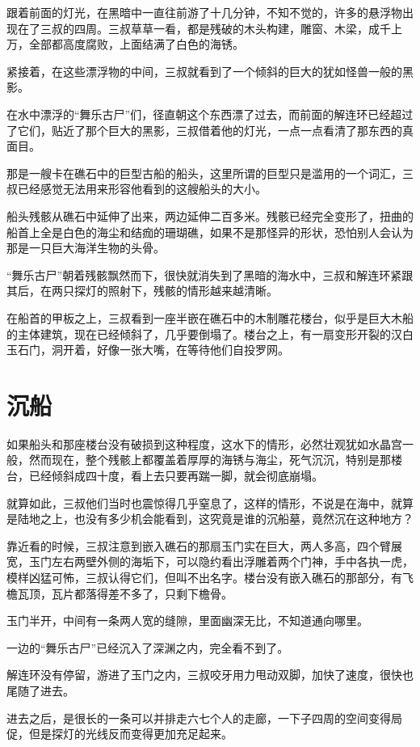 跟着前面的灯光，在黑暗中一直往前游了十几分钟，不知不觉的，许多的悬浮物出现在了三叔的四周。三叔草草一看，都是残破的木头构建，雕窗、木梁，成千上万，全部都高度腐败，上面结满了白色的海锈。

紧接着，在这些漂浮物的中间，三叔就看到了一个倾斜的巨大的犹如怪兽一般的黑影。

在水中漂浮的“舞乐古尸”们，径直朝这个东西漂了过去，而前面的解连环已经超过了它们，贴近了那个巨大的黑影，三叔借着他的灯光，一点一点看清了那东西的真面目。

那是一艘卡在礁石中的巨型古船的船头，这里所谓的巨型只是滥用的一个词汇，三叔已经感觉无法用来形容他看到的这艘船头的大小。

船头残骸从礁石中延伸了出来，两边延伸二百多米。残骸已经完全变形了，扭曲的船首上全是白色的海尘和结痂的珊瑚礁，如果不是那怪异的形状，恐怕别人会认为那是一只巨大海洋生物的头骨。

“舞乐古尸”朝着残骸飘然而下，很快就消失到了黑暗的海水中，三叔和解连环紧跟其后，在两只探灯的照射下，残骸的情形越来越清晰。

在船首的甲板之上，三叔看到一座半嵌在礁石中的木制雕花楼台，似乎是巨大木船的主体建筑，现在已经倾斜了，几乎要倒塌了。楼台之上，有一扇变形开裂的汉白玉石门，洞开着，好像一张大嘴，在等待他们自投罗网。

\chapter{沉船}

如果船头和那座楼台没有破损到这种程度，这水下的情形，必然壮观犹如水晶宫一般，然而现在，整个残骸上都覆盖着厚厚的海锈与海尘，死气沉沉，特别是那楼台，已经倾斜成四十度，看上去只要再踹一脚，就会彻底崩塌。

就算如此，三叔他们当时也震惊得几乎窒息了，这样的情形，不说是在海中，就算是陆地之上，也没有多少机会能看到，这究竟是谁的沉船墓，竟然沉在这种地方？

靠近看的时候，三叔注意到嵌入礁石的那扇玉门实在巨大，两人多高，四个臂展宽，玉门左右两壁外侧的海垢下，可以隐约看出浮雕着两个门神，手中各执一虎，模样凶猛可怖，三叔认得它们，但叫不出名字。楼台没有嵌入礁石的那部分，有飞檐瓦顶，瓦片都落得差不多了，只剩下檐骨。

玉门半开，中间有一条两人宽的缝隙，里面幽深无比，不知道通向哪里。

一边的“舞乐古尸”已经沉入了深渊之内，完全看不到了。

解连环没有停留，游进了玉门之内，三叔咬牙用力甩动双脚，加快了速度，很快也尾随了进去。

进去之后，是很长的一条可以并排走六七个人的走廊，一下子四周的空间变得局促，但是探灯的光线反而变得更加充足起来。


